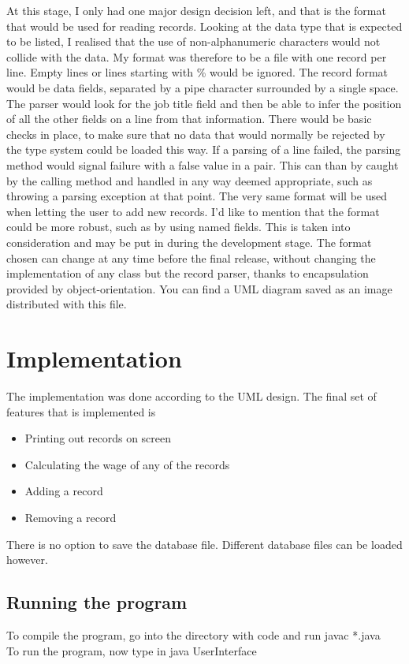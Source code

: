 \documentclass{report}
\begin{document}
At this stage, I only had one major design decision left, and that is
the format that would be used for reading records. Looking at the data
type that is expected to be listed, I realised that the use of
non-alphanumeric characters would not collide with the data. My format
was therefore to be a file with one record per line. Empty lines or
lines starting with \% would be ignored. The record format would be
data fields, separated by a pipe character surrounded by a single
space. The parser would look for the job title field and then be able
to infer the position of all the other fields on a line from that
information. There would be basic checks in place, to make sure that
no data that would normally be rejected by the type system could be
loaded this way. If a parsing of a line failed, the parsing method
would signal failure with a false value in a pair. This can than by
caught by the calling method and handled in any way deemed
appropriate, such as throwing a parsing exception at that point. The
very same format will be used when letting the user to add new
records. I'd like to mention that the format could be more robust,
such as by using named fields. This is taken into consideration and
may be put in during the development stage. The format chosen can
change at any time before the final release, without changing the
implementation of any class but the record parser, thanks to
encapsulation provided by object-orientation. You can find a UML
diagram saved as an image distributed with this file.

\section*{Implementation}
The implementation was done according to the UML design. The final set
of features that is implemented is
\begin{itemize}
  \item{Printing out records on screen}
  \item{Calculating the wage of any of the records}
  \item{Adding a record}
  \item{Removing a record}
\end{itemize}

There is no option to save the database file. Different database files
can be loaded however.

\subsection*{Running the program}
To compile the program, go into the directory with code and run javac
*.java\\ To run the program, now type in java UserInterface\\
\end{document}
